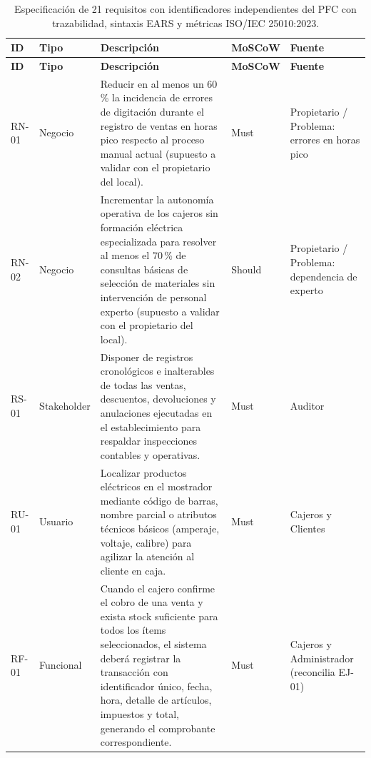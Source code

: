 \documentclass[onecolumn,12pt,a4paper]{IEEEtran}
\begin{document}
	\begin{longtable}{>{\raggedright\arraybackslash}p{1.4cm} >{\raggedright\arraybackslash}p{2.3cm} >{\raggedright\arraybackslash}p{7.6cm} >{\raggedright\arraybackslash}p{1.6cm} >{\raggedright\arraybackslash}p{2.3cm}}
		\caption{Especificaci\'on de 21 requisitos con identificadores independientes del PFC con trazabilidad, sintaxis EARS y m\'etricas ISO/IEC 25010:2023.}
		\label{tab:requisitos_pfc}\\
		\toprule
		\textbf{ID} & \textbf{Tipo} & \textbf{Descripci\'on} & \textbf{MoSCoW} & \textbf{Fuente} \\
		\midrule
		\endfirsthead
		\toprule
		\textbf{ID} & \textbf{Tipo} & \textbf{Descripci\'on} & \textbf{MoSCoW} & \textbf{Fuente} \\
		\midrule
		\endhead
		\bottomrule
		\endfoot
		RN-01 & Negocio & Reducir en al menos un 60\,\% la incidencia de errores de digitaci\'on durante el registro de ventas en horas pico respecto al proceso manual actual (supuesto a validar con el propietario del local). & Must & Propietario / Problema: errores en horas pico \\
		\midrule
		RN-02 & Negocio & Incrementar la autonom\'ia operativa de los cajeros sin formaci\'on el\'ectrica especializada para resolver al menos el 70\,\% de consultas b\'asicas de selecci\'on de materiales sin intervenci\'on de personal experto (supuesto a validar con el propietario del local). & Should & Propietario / Problema: dependencia de experto \\
		\midrule
		RS-01 & Stakeholder & Disponer de registros cronol\'ogicos e inalterables de todas las ventas, descuentos, devoluciones y anulaciones ejecutadas en el establecimiento para respaldar inspecciones contables y operativas. & Must & Auditor \\
		\midrule
		RU-01 & Usuario & Localizar productos el\'ectricos en el mostrador mediante c\'odigo de barras, nombre parcial o atributos t\'ecnicos b\'asicos (amperaje, voltaje, calibre) para agilizar la atenci\'on al cliente en caja. & Must & Cajeros y Clientes \\
		\midrule
		RF-01 & Funcional & [EARS: Dirigido por eventos] Cuando el cajero confirme el cobro de una venta y exista stock suficiente para todos los \'items seleccionados, el sistema deber\'a registrar la transacci\'on con identificador \'unico, fecha, hora, detalle de art\'iculos, impuestos y total, generando el comprobante correspondiente. & Must & Cajeros y Administrador (reconcilia EJ-01) \\

\end{longtable}
\end{document}
